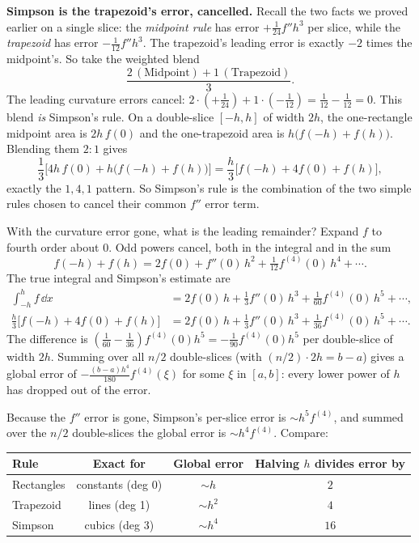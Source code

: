 \begin{whybox}
\textbf{Simpson is the trapezoid's error, cancelled.} Recall the two facts we proved earlier on a single slice: the \emph{midpoint rule} has error $+\tfrac{1}{24} f'' h^3$ per slice, while the \emph{trapezoid} has error $-\tfrac{1}{12}f'' h^3$. The trapezoid's leading error is exactly $-2$ times the midpoint's. So take the weighted blend
\[
\frac{2\,(\text{Midpoint}) + 1\,(\text{Trapezoid})}{3}.
\]
The leading curvature errors cancel: $2\cdot(+\tfrac{1}{24}) + 1\cdot(-\tfrac{1}{12}) = \tfrac{1}{12} - \tfrac{1}{12} = 0$. This blend \emph{is} Simpson's rule. On a double-slice $[-h,h]$ of width $2h$, the one-rectangle midpoint area is $2h\,f(0)$ and the one-trapezoid area is $h\big(f(-h)+f(h)\big)$. Blending them $2{:}1$ gives
\[
\frac13\Big[4h\,f(0) + h\big(f(-h)+f(h)\big)\Big] = \frac{h}{3}\Big[f(-h)+4f(0)+f(h)\Big],
\]
exactly the $1,4,1$ pattern. So Simpson's rule is the combination of the two simple rules chosen to cancel their common $f''$ error term.

With the curvature error gone, what is the leading remainder? Expand $f$ to fourth order about $0$. Odd powers cancel, both in the integral and in the sum
\[
f(-h)+f(h) = 2f(0) + f''(0)\,h^2 + \tfrac{1}{12}f^{(4)}(0)\,h^4 + \cdots.
\]
The true integral and Simpson's estimate are
\begin{align*}
\int_{-h}^{h} f\,\dd x &= 2f(0)\,h + \tfrac{1}{3}f''(0)\,h^3 + \tfrac{1}{60}f^{(4)}(0)\,h^5 + \cdots,\\
\frac{h}{3}\big[f(-h)+4f(0)+f(h)\big] &= 2f(0)\,h + \tfrac{1}{3}f''(0)\,h^3 + \tfrac{1}{36}f^{(4)}(0)\,h^5 + \cdots.
\end{align*}
The difference is $(\tfrac{1}{60} - \tfrac{1}{36})f^{(4)}(0)h^5 = -\tfrac{1}{90}f^{(4)}(0)h^5$ per double-slice of width $2h$. Summing over all $n/2$ double-slices (with $(n/2)\cdot 2h = b-a$) gives a global error of $-\tfrac{(b-a)h^4}{180}f^{(4)}(\xi)$ for some $\xi$ in $[a,b]$: every lower power of $h$ has dropped out of the error.
\end{whybox}

Because the $f''$ error is gone, Simpson's per-slice error is $\sim h^5 f^{(4)}$, and summed over the $n/2$ double-slices the global error is $\sim h^4 f^{(4)}$. Compare:

\begin{center}
\renewcommand{\arraystretch}{1.3}
\begin{tabular}{lccc}
\toprule
Rule & Exact for & Global error & Halving $h$ divides error by\\
\midrule
Rectangles & constants (deg 0) & $\sim h$ & $2$\\
Trapezoid  & lines (deg 1)     & $\sim h^2$ & $4$\\
Simpson    & cubics (deg 3)    & $\sim h^4$ & $16$\\
\bottomrule
\end{tabular}
\end{center}

